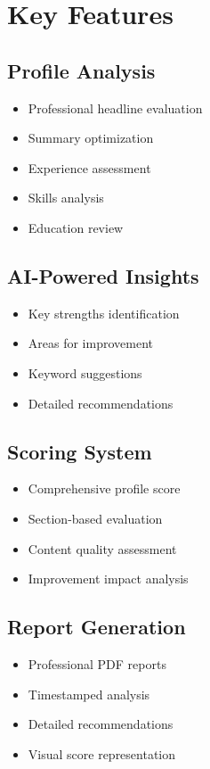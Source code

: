 \documentclass[12pt,a4paper]{article}
\begin{document}
\section{Key Features}

\subsection{Profile Analysis}
\begin{itemize}
    \item Professional headline evaluation
    \item Summary optimization
    \item Experience assessment
    \item Skills analysis
    \item Education review
\end{itemize}

\subsection{AI-Powered Insights}
\begin{itemize}
    \item Key strengths identification
    \item Areas for improvement
    \item Keyword suggestions
    \item Detailed recommendations
\end{itemize}

\subsection{Scoring System}
\begin{itemize}
    \item Comprehensive profile score
    \item Section-based evaluation
    \item Content quality assessment
    \item Improvement impact analysis
\end{itemize}

\subsection{Report Generation}
\begin{itemize}
    \item Professional PDF reports
    \item Timestamped analysis
    \item Detailed recommendations
    \item Visual score representation
\end{itemize}
\end{document}
